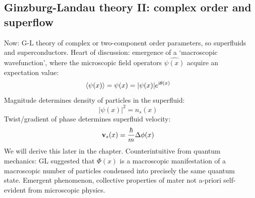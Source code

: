 \documentclass[../main.tex]{subfiles}
\begin{document}

\subsection{Ginzburg-Landau theory II: complex order and superflow}

Now: G-L theory of complex or two-component order parameters, so superfluids and superconductors.
Heart of discussion: emergence of a `macroscopic wavefunction', where the microscopic field operators \(\hat{\psi(x)}\) acquire an expectation value:
\begin{equation}
    \braket{\psi (x)} = \psi (x) = \vert \psi (x) \vert e^{\mathrm{i} \theta(x)}
\end{equation}
Magnitude determines density of particles in the superfluid:
\begin{equation}
    \vert \psi(x) \vert^2 = n_s (x)
\end{equation}
Twist/gradient of phase determines superfluid velocity:
\begin{equation}
    \bm{\mathrm{v}}_s (x) = \frac{\hbar}{m} \Delta \phi (x)
\end{equation}
We will derive this later in the chapter.
Counterintuitive from quantum mechanics: GL suggested that \(\Phi(x)\) is a macroscopic manifestation of a macroscopic number of particles condensed into precisely the same quantum state.
Emergent phenomenon, collective properties of mater not a-priori self-evident from microscopic physics.
\end{document}
